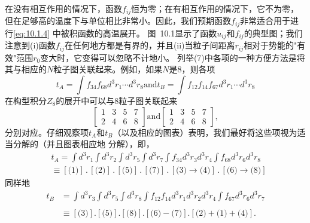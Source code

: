 在没有相互作用的情况下，函数\(f_{ij}\)恒为零；在有相互作用的情况下，它不为零，但在足够高的温度下与单位相比非常小。因此，我们预期函数\(f_{ij}\)非常适合用于进行\autoref{eq:10.1.4} 中被积函数的高温展开。
图~10.1显示了函数\(u_{ij}\)和\(f_{ij}\)的典型图；我们注意到(i)函数\(f_{ij}\)在任何地方都是有界的，并且(ii)当粒子间距离\(r_{ij}\)相对于势能的"有效"范围\(r_{0}\)变大时，它变得可以忽略不计地小。
列举(7)中各项的一种方便方法是将其与相应的\(N\)粒子图关联起来。例如，如果\(N\)是8，则各项
\begin{equation}\tag{10.1.7}\label{eq:10.1.7}
t _ { A } = \int f _ { 34 } f _ { 68 } d ^{3} r _ { 1 } \cdots d ^{3} r _ { 8 }  \mathrm { a n d }  t _ { B } = \int f _ { 12 } f _ { 14 } f _ { 67 } d ^{3} r _ { 1 } \cdots d ^{3} r _ { 8 }
\end{equation}
在构型积分\(Z_{8}\)的展开中可以与8粒子图关联起来
\begin{equation}\tag{10.1.8}\label{eq:10.1.8}
\left[ \begin{array}{llll} { 1 } & { 3 } & { 5 } & { 7 } \\{ 2 } & { 4 } & { 6 } & { 8 } \end{array} \right]  \mathrm { a n d }  \left[ \begin{array}{llll} { 1 } & { 3 } & { 5 } & { 7 } \\{ 2 } & { 4 } & { 6 } & { 8 } \end{array} \right] ,
\end{equation}
分别对应。仔细观察项\(t_{A}\)和\(t_{B}\)（以及相应的图表）表明，我们最好将这些项视为适当分解的（并且图表相应地
分解），即，
\begin{equation}\tag{10.1.9}\label{eq:10.1.9}
\begin{array}{rl} & { t _ { A } = \int d ^{3} r _ { 1 } \int d ^{3} r _ { 2 } \int d ^{3} r _ { 5 } \int d ^{3} r _ { 7 } \int f _ { 34 } d ^{3} r _ { 3 } d ^{3} r _ { 4 } \int f _ { 68 } d ^{3} r _ { 6 } d ^{3} r _ { 8 } } \\& {  \equiv [ \text{(1)} ] \, . \, [ \text{(2)} ] \, . \, [ \text{(5)} ] \, . \, [ \text{(7)} ] \, . \, [ \text{(3)} \longrightarrow \text{(4)} ] \, . \, [ \text{(6)} \longrightarrow \text{(8)} ] } \end{array}
\end{equation}
同样地
\begin{equation}\tag{10.1.10}\label{eq:10.1.10}
\begin{aligned}t_B&=\int d^3r_3\int d^3r_5\int d^3r_8\int f_{12}f_{14}d^3r_1d^3r_2d^3r_4\int f_{67}d^3r_6d^3r_7\\\\&\equiv[\text{(3)}].[\text{(5)}].[\text{(8)}].[\text{(6)}-\text{(7)}].[\text{(2)}+\text{(1)}+\text{(4)}].\end{aligned}
\end{equation}

